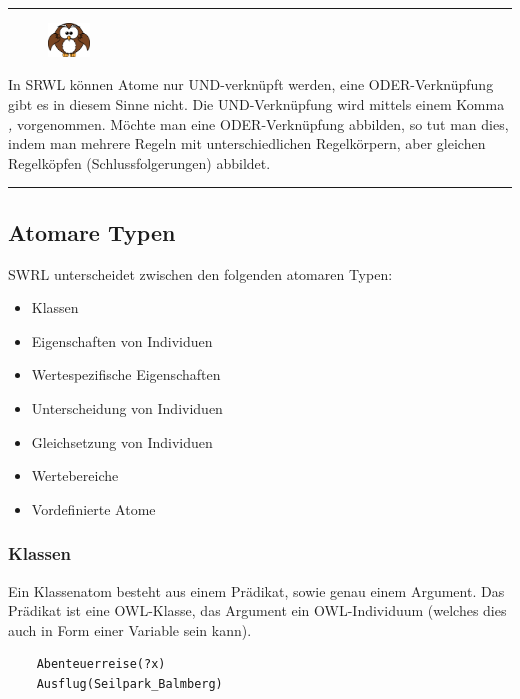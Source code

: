 \noindent\rule[1ex]{\textwidth}{1pt}
\begin{figure}
    \vspace{-12pt}
    \includegraphics[width=0.1\textwidth]{bilder/owl.png}
\end{figure}
In SRWL können Atome nur UND-verknüpft werden, eine ODER-Verknüpfung gibt es in diesem Sinne nicht. Die UND-Verknüpfung wird mittels einem Komma \textit{,} vorgenommen. Möchte man eine ODER-Verknüpfung abbilden, so tut man dies, indem man mehrere Regeln mit unterschiedlichen Regelkörpern, aber gleichen Regelköpfen (Schlussfolgerungen) abbildet.

\noindent\rule[1ex]{\textwidth}{1pt}

\subsection{Atomare Typen}
\label{subsec:swrl_aufbau_atomaretypen}
SWRL unterscheidet zwischen den folgenden atomaren Typen:
\begin{itemize}
    \item Klassen
    \item Eigenschaften von Individuen
    \item Wertespezifische Eigenschaften
    \item Unterscheidung von Individuen
    \item Gleichsetzung von Individuen
    \item Wertebereiche
    \item Vordefinierte Atome
\end{itemize}

\subsubsection{Klassen}
\label{ssubsec:swrl_aufbau_atomaretypen_klassen}
Ein Klassenatom besteht aus einem Prädikat, sowie genau einem Argument. Das Prädikat ist eine OWL-Klasse, das Argument ein OWL-Individuum (welches dies auch in Form einer Variable sein kann).
\lstset{language=XML}
\begin{lstlisting}
    Abenteuerreise(?x)
    Ausflug(Seilpark_Balmberg)
\end{lstlisting}

